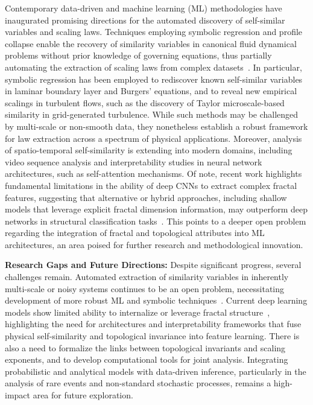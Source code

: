 \documentclass[sigconf]{acmart}
\begin{document}
Contemporary data-driven and machine learning (ML) methodologies have inaugurated promising directions for the automated discovery of self-similar variables and scaling laws. Techniques employing symbolic regression and profile collapse enable the recovery of similarity variables in canonical fluid dynamical problems without prior knowledge of governing equations, thus partially automating the extraction of scaling laws from complex datasets~\cite{ref65}. In particular, symbolic regression has been employed to rediscover known self-similar variables in laminar boundary layer and Burgers' equations, and to reveal new empirical scalings in turbulent flows, such as the discovery of Taylor microscale-based similarity in grid-generated turbulence. While such methods may be challenged by multi-scale or non-smooth data, they nonetheless establish a robust framework for law extraction across a spectrum of physical applications. Moreover, analysis of spatio-temporal self-similarity is extending into modern domains, including video sequence analysis and interpretability studies in neural network architectures, such as self-attention mechanisms. Of note, recent work highlights fundamental limitations in the ability of deep CNNs to extract complex fractal features, suggesting that alternative or hybrid approaches, including shallow models that leverage explicit fractal dimension information, may outperform deep networks in structural classification tasks~\cite{ref39}. This points to a deeper open problem regarding the integration of fractal and topological attributes into ML architectures, an area poised for further research and methodological innovation.

\vspace{1em}

\textbf{Research Gaps and Future Directions:} Despite significant progress, several challenges remain. Automated extraction of similarity variables in inherently multi-scale or noisy systems continues to be an open problem, necessitating development of more robust ML and symbolic techniques~\cite{ref65}. Current deep learning models show limited ability to internalize or leverage fractal structure~\cite{ref39}, highlighting the need for architectures and interpretability frameworks that fuse physical self-similarity and topological invariance into feature learning. There is also a need to formalize the links between topological invariants and scaling exponents, and to develop computational tools for joint analysis. Integrating probabilistic and analytical models with data-driven inference, particularly in the analysis of rare events and non-standard stochastic processes, remains a high-impact area for future exploration.
\end{document}
